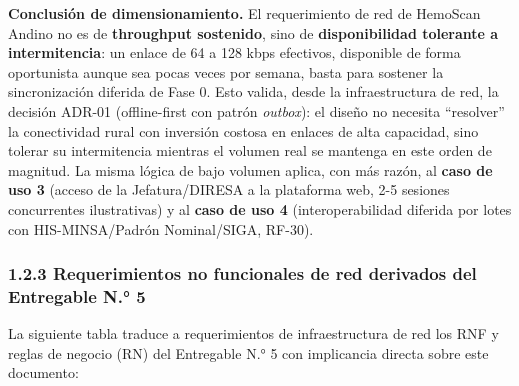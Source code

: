 \documentclass[11pt,a4paper]{article}
\begin{document}
\textbf{Conclusión de dimensionamiento.} El requerimiento de red de HemoScan Andino no es de \textbf{throughput sostenido}, sino de \textbf{disponibilidad tolerante a intermitencia}: un enlace de 64 a 128 kbps efectivos, disponible de forma oportunista aunque sea pocas veces por semana, basta para sostener la sincronización diferida de Fase 0. Esto valida, desde la infraestructura de red, la decisión ADR-01 (offline-first con patrón \emph{outbox}): el diseño no necesita ``resolver'' la conectividad rural con inversión costosa en enlaces de alta capacidad, sino tolerar su intermitencia mientras el volumen real se mantenga en este orden de magnitud. La misma lógica de bajo volumen aplica, con más razón, al \textbf{caso de uso 3} (acceso de la Jefatura/DIRESA a la plataforma web, 2-5 sesiones concurrentes ilustrativas) y al \textbf{caso de uso 4} (interoperabilidad diferida por lotes con HIS-MINSA/Padrón Nominal/SIGA, RF-30).

\subsubsection{1.2.3 Requerimientos no funcionales de red derivados del Entregable N.° 5}\label{requerimientos-no-funcionales-de-red-derivados-del-entregable-n.-5}

La siguiente tabla traduce a requerimientos de infraestructura de red los RNF y reglas de negocio (RN) del Entregable N.° 5 con implicancia directa sobre este documento:
\end{document}

